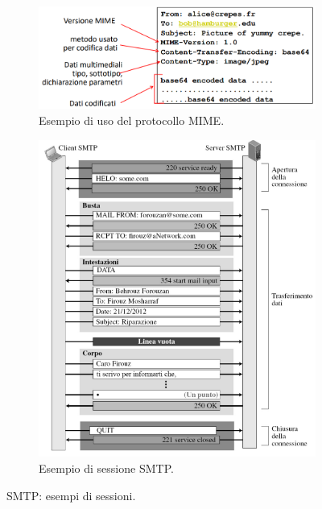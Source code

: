 \documentclass[11pt, italian, openany]{book}
\begin{document}
\begin{sloppypar}
\begin{figure}[!h]
	\begin{subfigure}[t]{0.49 \linewidth} \centering
		\includegraphics[scale=0.275]{images/smtp-mime.png}
		\caption{Esempio di uso del protocollo MIME.}
	\end{subfigure}
	\begin{subfigure}[t]{0.49 \linewidth} \centering
		\includegraphics[scale=0.32]{images/smtp-sessione.png}
		\caption{Esempio di sessione SMTP.}
	\end{subfigure}
	\caption{SMTP: esempi di sessioni.}
	\label{fig:smtp-esempi}
\end{figure}

\pagebreak


\end{sloppypar}
\end{document}
